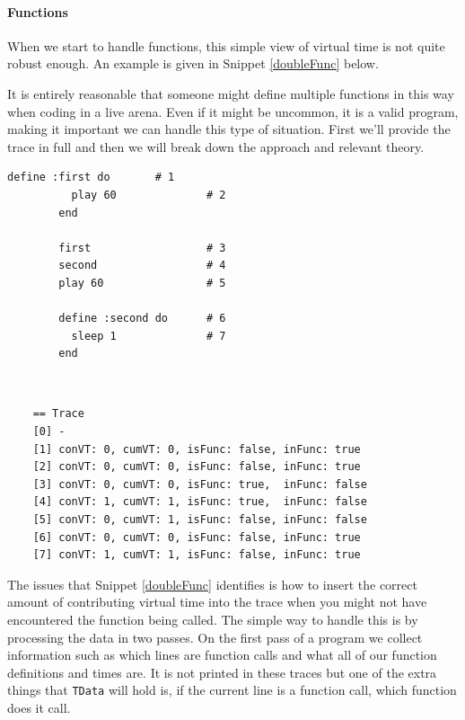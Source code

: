 \documentclass[11pt, abstracton, twoside, titlepage=true]{scrartcl}
\begin{document}
\paragraph{Functions}
When we start to handle functions, this simple view of virtual time is not
quite robust enough. An example is given in Snippet \ref{doubleFunc} below.

It is entirely reasonable that someone might define multiple functions in this 
way when coding in a live arena. Even if it might be uncommon, it is a valid
program, making it important we can handle this type of situation. First we'll
provide the trace in full and then we will break down the approach and relevant 
theory.

\begin{minipage}{\textwidth}
	\begin{lstlisting}[style = sonicpi]
        define :first do       # 1
          play 60              # 2
        end
        
        first                  # 3
        second                 # 4
        play 60                # 5

        define :second do      # 6
          sleep 1              # 7
        end
	\end{lstlisting}
	 \label{doubleFunc}
\end{minipage}
\\
\begin{lstlisting}
    == Trace
    [0] -
    [1] conVT: 0, cumVT: 0, isFunc: false, inFunc: true
    [2] conVT: 0, cumVT: 0, isFunc: false, inFunc: true
    [3] conVT: 0, cumVT: 0, isFunc: true,  inFunc: false
    [4] conVT: 1, cumVT: 1, isFunc: true,  inFunc: false
    [5] conVT: 0, cumVT: 1, isFunc: false, inFunc: false
    [6] conVT: 0, cumVT: 0, isFunc: false, inFunc: true
    [7] conVT: 1, cumVT: 1, isFunc: false, inFunc: true
\end{lstlisting}

The issues that Snippet \ref{doubleFunc} identifies is how to insert the correct
amount of contributing virtual time into the trace when you might not have 
encountered the function being called. The simple way to handle this is by processing
the data in two passes. On the first pass of a program we collect information
such as which lines are function calls and what all of our function definitions
and times are. It is not printed in these traces but one of the extra things that
\texttt{TData} will hold is, if the current line is a function call, which function
does it call.
\end{document}
